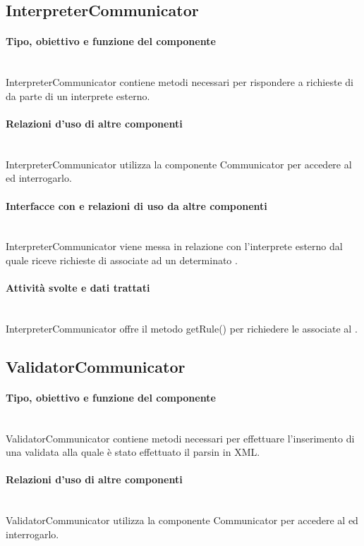 \documentclass[11pt,titlepage,a4paper]{report}
\begin{document}
\subsection{InterpreterCommunicator}
\paragraph{Tipo, obiettivo e funzione del componente}\\
InterpreterCommunicator contiene metodi necessari per rispondere a richieste di \br da parte di un interprete esterno.
\paragraph{Relazioni d'uso di altre componenti}\\
InterpreterCommunicator utilizza la componente Communicator per accedere al \re ed interrogarlo.
\paragraph{Interfacce con e relazioni di uso da altre componenti}\\
InterpreterCommunicator viene messa in relazione con l'interprete esterno dal quale riceve richieste di \brs associate ad un determinato \bo.
\paragraph{Attivit\`a svolte e dati trattati}\\
InterpreterCommunicator offre il metodo getRule() per richiedere le \br associate al \bo.

\subsection{ValidatorCommunicator}
\paragraph{Tipo, obiettivo e funzione del componente}\\
ValidatorCommunicator contiene metodi necessari per effettuare l'inserimento di una \br validata alla quale \`e stato effettuato il parsin in XML.
\paragraph{Relazioni d'uso di altre componenti}\\
ValidatorCommunicator utilizza la componente Communicator per accedere al \re ed interrogarlo.
\end{document}
